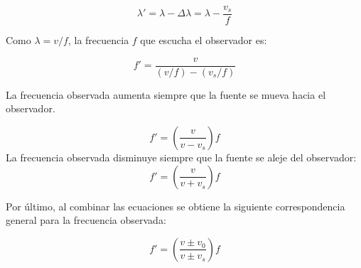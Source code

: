 \documentclass[10pt]{article}
\begin{document}
\begin{equation*}
	\lambda' = \lambda - \Delta \lambda = \lambda - \dfrac{v_s}{f}
\end{equation*}


Como $\lambda = v/f$, la frecuencia $f$ que escucha el observador es:

\begin{equation*}
	f' = \dfrac{v}{(v/f)-(v_s/f)}	
\end{equation*}

La frecuencia observada aumenta siempre que la fuente se mueva hacia el observador.

\begin{equation*}
	f' = \left( \dfrac{v}{v-v_s}\right)f
\end{equation*}
La frecuencia observada disminuye siempre que la fuente se aleje del observador:
\begin{equation*}
	f' = \left( \dfrac{v}{v+v_s}\right)f
\end{equation*}

Por último, al combinar las ecuaciones se obtiene la siguiente correspondencia general para la frecuencia observada:

\begin{equation*}
	f' = \left( \dfrac{v \pm v_0}{v \pm v_s}\right)f
\end{equation*}
\end{document}
